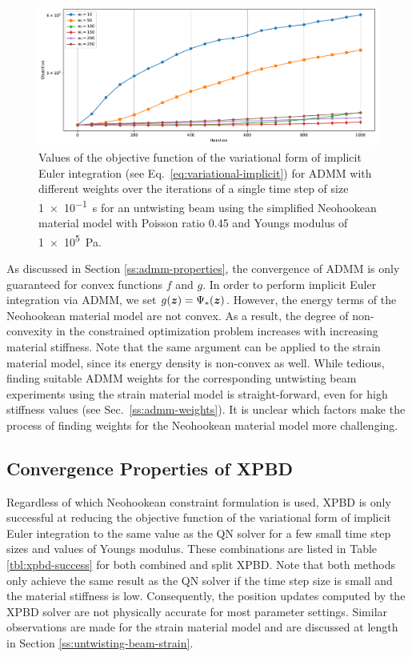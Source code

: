 \begin{figure}[t]
    \includegraphics[width=\textwidth]{figures/neohookean_admm_weights.pdf}
    \caption{Values of the objective function of the variational form of implicit Euler integration (see Eq.\ \ref{eq:variational-implicit}) for ADMM with different weights 
        over the iterations of a single time step of size \SI{1e-1}{\second} for an untwisting beam using the simplified Neohookean material model with Poisson ratio 0.45 and 
        Youngs modulus of \SI{1e5}{\pascal}.}
    \label{fig:neohookean-weights}
\end{figure}

As discussed in Section \ref{ss:admm-properties}, the convergence of ADMM is only guaranteed for convex functions $f$ and $g$. In order to perform implicit Euler integration 
via ADMM, we set $g(\bm{z}) = \Psi_*(\bm{z})$. However, the energy terms of the Neohookean material model are not convex. As a result, the degree of non-convexity in the 
constrained optimization problem increases with increasing material stiffness. Note that the same argument can be applied to the strain material model, since its energy density 
is non-convex as well. While tedious, finding suitable ADMM weights for the corresponding untwisting beam experiments using the strain material model is straight-forward, even 
for high stiffness values (see Sec.\ \ref{ss:admm-weights}). It is unclear which factors make the process of finding weights for the Neohookean material model more challenging. 

\subsection{Convergence Properties of XPBD}\label{ss:neohookean-xpbd}
Regardless of which Neohookean constraint formulation is used, XPBD is only successful at reducing the objective function of the variational form of implicit Euler 
integration to the same value as the QN solver for a few small time step sizes and values of Youngs modulus. These combinations are listed in Table \ref{tbl:xpbd-success}
for both combined and split XPBD. Note that both methods only achieve the same result as the QN solver if the time step size is small and the material stiffness is low. 
Consequently, the position updates computed by the XPBD solver are not physically accurate for most parameter settings. Similar observations are made for the strain 
material model and are discussed at length in Section \ref{ss:untwisting-beam-strain}.

